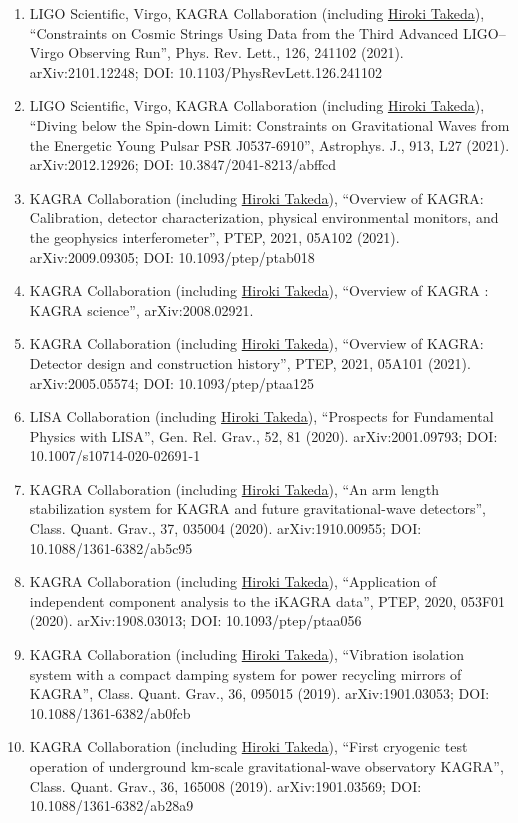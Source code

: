 \documentclass[uplatex, 11pt]{jsarticle}
\begin{document}
\begin{enumerate}
\item LIGO Scientific, Virgo, KAGRA Collaboration (including \uline{Hiroki Takeda}), “Constraints on Cosmic Strings Using Data from the Third Advanced LIGO–Virgo Observing Run”, Phys. Rev. Lett., 126, 241102 (2021). arXiv:2101.12248; DOI: 10.1103/PhysRevLett.126.241102
\item LIGO Scientific, Virgo, KAGRA Collaboration (including \uline{Hiroki Takeda}), “Diving below the Spin-down Limit: Constraints on Gravitational Waves from the
Energetic Young Pulsar PSR J0537-6910”, Astrophys. J., 913, L27 (2021). arXiv:2012.12926; DOI: 10.3847/2041-8213/abffcd
\item KAGRA Collaboration (including \uline{Hiroki Takeda}), “Overview of KAGRA: Calibration, detector characterization, physical environmental monitors, and the geophysics interferometer”, PTEP, 2021, 05A102 (2021). arXiv:2009.09305; DOI: 10.1093/ptep/ptab018
\item KAGRA Collaboration (including \uline{Hiroki Takeda}), “Overview of KAGRA : KAGRA science”, arXiv:2008.02921.
\item KAGRA Collaboration (including \uline{Hiroki Takeda}), “Overview of KAGRA: Detector design and construction history”, PTEP, 2021, 05A101 (2021). arXiv:2005.05574; DOI: 10.1093/ptep/ptaa125
\item LISA Collaboration (including \uline{Hiroki Takeda}), “Prospects for Fundamental Physics with LISA”, Gen. Rel. Grav., 52, 81 (2020). arXiv:2001.09793; DOI: 10.1007/s10714-020-02691-1
\item KAGRA Collaboration (including \uline{Hiroki Takeda}), “An arm length stabilization system for KAGRA and future gravitational-wave detectors”, Class. Quant. Grav., 37, 035004 (2020). arXiv:1910.00955; DOI: 10.1088/1361-6382/ab5c95
\item KAGRA Collaboration (including \uline{Hiroki Takeda}), “Application of independent component analysis to the iKAGRA data”, PTEP, 2020, 053F01 (2020). arXiv:1908.03013; DOI: 10.1093/ptep/ptaa056
\item KAGRA Collaboration (including \uline{Hiroki Takeda}), “Vibration isolation system with a compact damping system for power recycling mirrors of KAGRA”, Class. Quant. Grav., 36, 095015 (2019). arXiv:1901.03053; DOI: 10.1088/1361-6382/ab0fcb
\item KAGRA Collaboration (including \uline{Hiroki Takeda}), “First cryogenic test operation of underground km-scale gravitational-wave observatory KAGRA”, Class. Quant. Grav., 36, 165008 (2019). arXiv:1901.03569; DOI: 10.1088/1361-6382/ab28a9

\end{enumerate}
\end{document}
